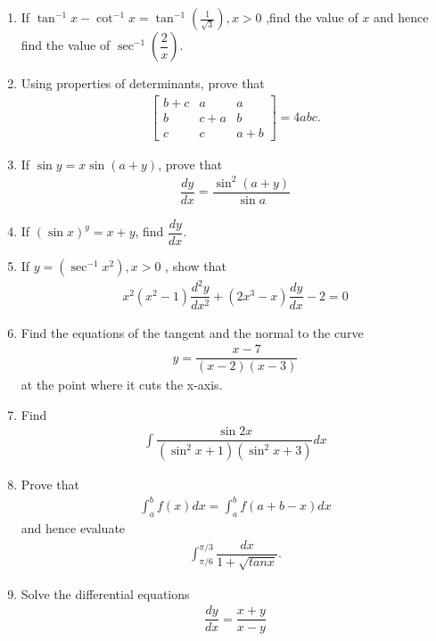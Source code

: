 \documentclass[12pt,-letter paper]{article}
\providecommand{\myvec}[1]{\ensuremath{\begin{bmatrix}#1\end{bmatrix}}}
\providecommand{\brak}[1]{\ensuremath{\left(#1\right)}}
\begin{document}
\begin{enumerate}
\item If $\tan^{-1}x-\cot^{-1}x =\tan^{-1}\brak{\frac{1}{ \sqrt3}}, x>0$ ,find the value of $x$ and hence find the value of $\sec^{-1}\left(\dfrac{2}{x}\right)$.

\item Using properties of determinants, prove that 
\begin{align*}
    \myvec{b+c&a&a\\b&c+a&b\\c&c&a+b}=4abc.
\end{align*}

\item If $\sin y = x \sin (a + y)$, prove that 
\begin{align*}
    \dfrac{dy}{dx} =\dfrac{\sin^{2}(a+y)}{\sin {a}}
\end{align*}

\item If $(\sin x)^y= x + y$, find $\dfrac{dy}{dx}$.

\item If $y=\brak{\sec^{-1}{x}^{2}},x>0$ , show that 
\begin{align*}
    x^2(x^2-1)\dfrac{d^{2}y}{dx^{2}}+(2x^{3}-x)\dfrac{dy}{dx}-2=0
\end{align*}

\item Find the equations of the tangent and the normal to the curve 
\begin{align*}
y=\dfrac{x-7}{(x-2)(x-3)}    
\end{align*}
at the point where it cuts the x-axis.

\item Find
\begin{align*}
\int\dfrac{\sin{2}x}{(\sin^{2}x+1)(\sin^{2}x+3)} dx
\end{align*}

\item Prove that 
\begin{align*}
\int_{a}^{b} f(x)dx=\int_{a}^{b}{f(a+b-x)dx}
\end{align*}
and hence evaluate
\begin{align*}
    \int_{\pi/6}^{\pi/3}\dfrac{dx}{1+\sqrt{tanx}}.
\end{align*}

\item Solve the differential equations
\begin{align*}
    \dfrac{dy}{dx}=\dfrac{x+y}{x-y}
\end{align*}


\end{enumerate}
\end{document}
